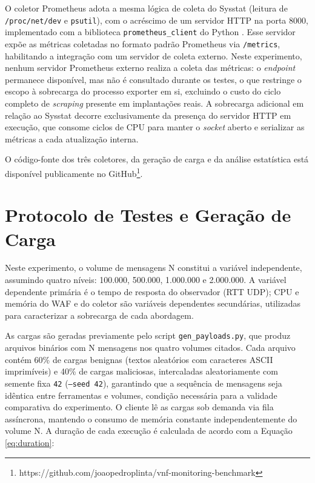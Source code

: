 O coletor Prometheus adota a mesma lógica de coleta do Sysstat (leitura de \texttt{/proc/\linebreak[0]net/dev} e \texttt{psutil}), com o acréscimo de um servidor HTTP na porta 8000, implementado com a biblioteca \texttt{prometheus\_client} do Python \cite{turnbull_prometheus_2018}. Esse servidor expõe as métricas coletadas no formato padrão Prometheus via \texttt{/metrics}, habilitando a integração com um servidor de coleta externo. Neste experimento, nenhum servidor Prometheus externo realiza a coleta das métricas: o \textit{endpoint} permanece disponível, mas não é consultado durante os testes, o que restringe o escopo à sobrecarga do processo exporter em si, excluindo o custo do ciclo completo de \textit{scraping} presente em implantações reais. A sobrecarga adicional em relação ao Sysstat decorre exclusivamente da presença do servidor HTTP em execução, que consome ciclos de CPU para manter o \textit{socket} aberto e serializar as métricas a cada atualização interna.

O código-fonte dos três coletores, da geração de carga e da análise estatística está disponível publicamente no GitHub\footnote{https://github.com/joaopedroplinta/vnf-monitoring-benchmark}.

\section{Protocolo de Testes e Geração de Carga}

Neste experimento, o volume de mensagens N constitui a variável independente, assumindo quatro níveis: 100.000, 500.000, 1.000.000 e 2.000.000. A variável dependente primária é o tempo de resposta do observador (RTT UDP); CPU e memória do WAF e do coletor são variáveis dependentes secundárias, utilizadas para caracterizar a sobrecarga de cada abordagem.

As cargas são geradas previamente pelo script \texttt{gen\_payloads.py}, que produz arquivos binários com N mensagens nos quatro volumes citados. Cada arquivo contém 60\% de cargas benignas (textos aleatórios com caracteres ASCII imprimíveis) e 40\% de cargas maliciosas, intercaladas aleatoriamente com semente fixa \texttt{42} (\texttt{--seed 42}), garantindo que a sequência de mensagens seja idêntica entre ferramentas e volumes, condição necessária para a validade comparativa do experimento. O cliente lê as cargas sob demanda via fila assíncrona, mantendo o consumo de memória constante independentemente do volume N. A duração de cada execução é calculada de acordo com a Equação \ref{eq:duration}:

